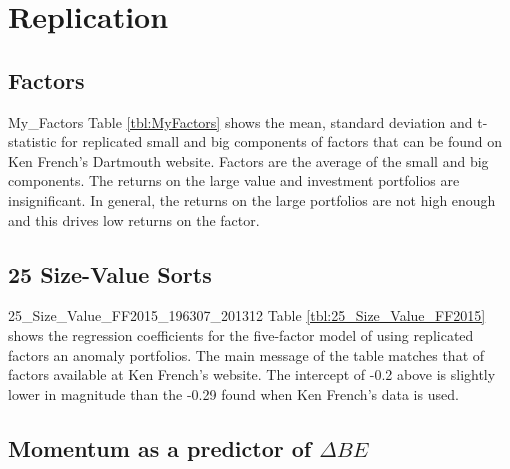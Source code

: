 
\section{Replication} \label{sec:repl}

\subsection{Factors}

{My_Factors}
Table \ref{tbl:MyFactors} shows the mean, standard deviation and t-statistic for
replicated small and big components of factors that can be found on Ken French's Dartmouth
website. Factors are the average of the small and big components. The returns on the large
value and investment portfolios are insignificant. In general, the returns on the large
portfolios are not high enough and this drives low returns on the factor.

\subsection{25 Size-Value Sorts}

{25_Size_Value_FF2015_196307_201312}
Table \ref{tbl:25_Size_Value_FF2015} shows the regression coefficients for the five-factor
model of \textcite{fama2015five} using replicated factors an anomaly portfolios. The main
message of the table matches that of factors available at Ken French's website. The
intercept of -0.2 above is slightly lower in magnitude than the -0.29 found when Ken
French's data is used.

\subsection{\textcite{asness2013devil} Momentum as a predictor of $\Delta BE$}
